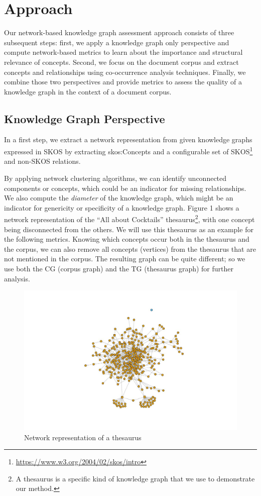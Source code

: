 \documentclass[runningheads,a4paper]{llncs}
\makeatletter
\def\maxwidth#1{\ifdim\Gin@nat@width>#1 #1\else\Gin@nat@width\fi}
\makeatother
\begin{document}
\section{Approach}

Our network-based knowledge graph assessment approach consists of three subsequent steps: first, we apply a knowledge graph only perspective and compute network-based metrics to learn about the importance and structural relevance of concepts. Second, we focus on the document corpus and extract concepts and relationships using co-occurrence analysis techniques. Finally, we combine those two perspectives and provide metrics to assess the quality of a knowledge graph in the context of a document corpus.

\subsection{Knowledge Graph Perspective}

In a first step, we extract a network representation from given knowledge graphs expressed in SKOS by extracting skos:Concepts and a configurable set of SKOS\footnote{\url{https://www.w3.org/2004/02/skos/intro}} and non-SKOS relations.

By applying network clustering algorithms, we can identify unconnected components or concepts, which could be an indicator for missing relationships. We also compute the {\em diameter} of the knowledge graph, which might be an indicator for genericity or specificity of a knowledge graph. Figure 1 shows a network representation of the ``All about Cocktails'' thesaurus\footnote{ A thesaurus is a specific kind of knowledge graph that we use to demonstrate our method.}, with one concept being disconnected from the others. We will use this thesaurus as an example for the following metrics. Knowing which concepts occur both in the thesaurus and the corpus, we can also remove all concepts (vertices) from the thesaurus that are not mentioned in the corpus. The resulting graph can be quite different; so we use both the CG (corpus graph) and the TG (thesaurus graph) for further analysis.
\begin{figure}[h!]
\centering
\includegraphics[width=\maxwidth{\textwidth}]{./img/image1.jpg}
\cprotect\caption{Network representation of a thesaurus}
\label{}
\end{figure}
\end{document}
